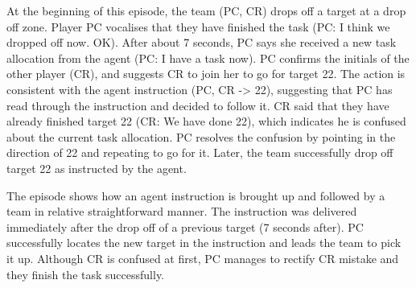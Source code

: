 At the beginning of this episode, the team (PC, CR) drops off a target at a drop off zone. Player PC vocalises that they have finished the task (PC: I think we dropped off now. OK).  After about 7 seconds, PC says she received a new task allocation from the agent (PC: I have a task now). PC confirms the initials of the other player (CR), and suggests CR to join her to go for target 22. The action is consistent with the agent instruction (PC, CR -> 22), suggesting that PC has read through the instruction and decided to follow it. CR said that they have already finished target 22 (CR: We have done 22), which indicates he is confused about the current task allocation. PC resolves the confusion by pointing in the direction of 22 and repeating to go for it. Later, the team successfully drop off target 22 as instructed by the agent.\\



\noindent{} 
\hfill \break




The episode shows how an agent instruction is brought up and followed by a team in relative straightforward manner. The instruction was delivered immediately after the drop off of a previous target (7 seconds after). PC successfully locates the new target in the instruction and leads the team to pick it up. Although CR is confused at first, PC manages to rectify CR mistake and they finish the task successfully. \\

